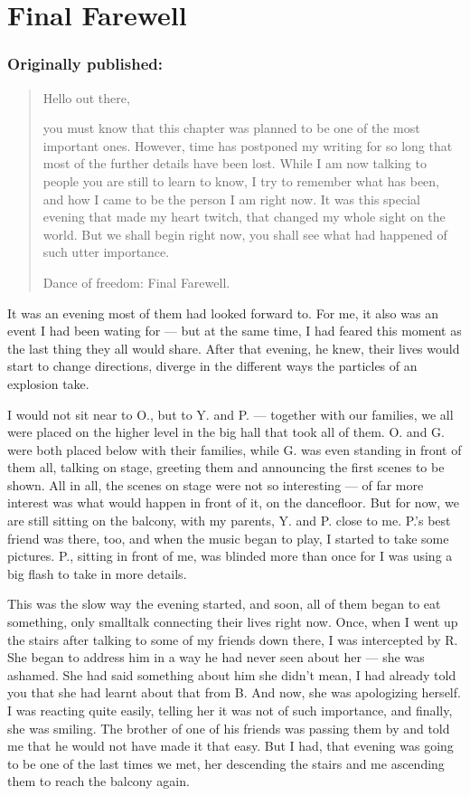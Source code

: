 \chapter{Final Farewell}
\label{cha:final-farewell}
\subsection*{Originally published: }
\begin{quote}
Hello out there, 

you must know that this chapter was planned to be one of the most important ones. However, time has postponed my writing for so long that most of the further details have been lost. While I am now talking to people you are still to learn to know, I try to remember what has been, and how I came to be the person I am right now. It was this special evening that made my heart twitch, that changed my whole sight on the world. But we shall begin right now, you shall see what had happened of such utter importance.

Dance of freedom: Final Farewell.
\end{quote}

It was an evening most of them had looked forward to. For me, it also was an event I had been wating for --- but at the same time, I had feared this moment as the last thing they all would share. After that evening, he knew, their lives would start to change directions, diverge in the different ways the particles of an explosion take.

I would not sit near to O., but to Y. and P. --- together with our families, we all were placed on the higher level in the big hall that took all of them. O. and G. were both placed below with their families, while G. was even standing in front of them all, talking on stage, greeting them and announcing the first scenes to be shown. All in all, the scenes on stage were not so interesting --- of far more interest was what would happen in front of it, on the dancefloor. But for now, we are still sitting on the balcony, with my parents, Y. and P. close to me. P.'s best friend was there, too, and when the music began to play, I started to take some pictures. P., sitting in front of me, was blinded more than once for I was using a big flash to take in more details.

This was the slow way the evening started, and soon, all of them began to eat something, only smalltalk connecting their lives right now. Once, when I went up the stairs after talking to some of my friends down there, I was intercepted by R. She began to address him in a way he had never seen about her --- she was ashamed. She had said something about him she didn't mean, I had already told you that she had learnt about that from B. And now, she was apologizing herself. I was reacting quite easily, telling her it was not of such importance, and finally, she was smiling. The brother of one of his friends was passing them by and told me that he would not have made it that easy. But I had, that evening was going to be one of the last times we met, her descending the stairs and me ascending them to reach the balcony again.

